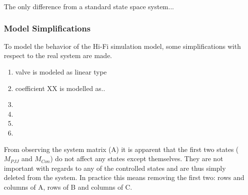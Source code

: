 The only difference from a standard state space system...

\subsubsection{Model Simplifications}
To model the behavior of the Hi-Fi simulation model, some simplifications with respect to the real system are made.

\begin{enumerate}
	\item valve is modeled as linear type
	\item coefficient XX is modelled as..
	\item
	\item
	\item
	\item
\end{enumerate}

From observing the system matrix (A) it is apparent that the first two states ($M_{PJJ}$ and $M_{Con}$) do not affect any states except themselves. They are not important with regards to any of the controlled states and are thus simply deleted from the system. In practice this means removing the first two: rows and columns of A, rows of B and columns of C.